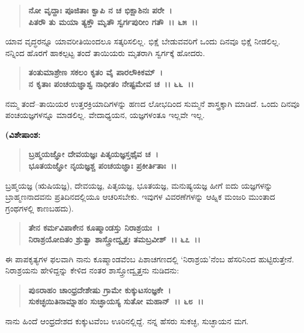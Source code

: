 \begin{verse}
\textbf{ನೋ ವೃದ್ದಾಃ ಪೂಜಿತಾಃ ಕ್ವಾಪಿ ನ ಚ ಭಿಕ್ಷಾಶಿನಃ ಪರೇ~।}\\\textbf{ಪಿತರೌ ತು ಮಯಾ ತ್ಯಕ್ತೌ ಮೃತೌ ಸ್ವರ್ಗಪುರೀಂ ಗತೌ~।। ೬೫~।।}
\end{verse}

ಯಾವ ವೃದ್ಧರನ್ನೂ ಯಾವರೀತಿಯಿಂದಲೂ ಸತ್ಕರಿಸಲಿಲ್ಲ. ಭಿಕ್ಷೆ ಬೇಡುವವರಿಗೆ ಒಂದು ದಿನವೂ ಭಿಕ್ಷೆ ನೀಡಲಿಲ್ಲ. ನನ್ನಿಂದ ಹೊರಗೆ ಹಾಕಲ್ಪಟ್ಟ ತಂದೆ ತಾಯಿಯರು ಮೃತರಾಗಿ ಸ್ವರ್ಗಕ್ಕೆ ಹೋದರು.

\begin{verse}
\textbf{ತಂತುಮಾಶ್ರೇಣ ಸಕಲಂ ಕೃತಂ ವೈ ಪಾರಲೌಕಿಕಮ್~।}\\\textbf{ನ ಕೃತಾಃ ಪಂಚಯಜ್ಞಾಶ್ವ ನಾಧೀತಂ ನೇಷ್ಟಮೇವ ಚ~।। ೬೬~।।}
\end{verse}

ನಮ್ಮ ತಂದೆ–ತಾಯಿಯರ ಉತ್ತರಕ್ರಿಯಾದಿಗಳನ್ನು ಹಣದ ಲೋಭದಿಂದ ಸುಮ್ಮನೆ ಶಾಸ್ತ್ರಕ್ಕಾಗಿ ಮಾಡಿದೆ. ಒಂದು ದಿನವೂ ಪಂಚಯಜ್ಞಗಳನ್ನೂ ಮಾಡಲಿಲ್ಲ. ವೇದಾಧ್ಯಯನ, ಯಜ್ಞಗಳಂತೂ ಇಲ್ಲವೇ ಇಲ್ಲ.

\begin{flushleft}
\textbf{(ವಿಶೇಷಾಂಶ:}
\end{flushleft}

\begin{verse}
\textbf{ಬ್ರಹ್ಮಯಜ್ಞೋ ದೇವಯಜ್ಞಃ ಪಿತೃಯಜ್ಞಸ್ತಥೈವ ಚ~।}\\\textbf{ಭೂತಯಜ್ಞೋ ನೃಯಜ್ಞಶ್ಚ ಪಂಚಯಜ್ಞಾಃ ಪ್ರಕೀರ್ತಿತಾಃ~।।}
\end{verse}

ಬ್ರಹ್ಮಯಜ್ಞ (ಋಷಿಯಜ್ಞ), ದೇವಯಜ್ಞ, ಪಿತೃಯಜ್ಞ, ಭೂತಯಜ್ಞ, ಮನುಷ್ಯಯಜ್ಞ ಹೀಗೆ ಐದು ಯಜ್ಞಗಳನ್ನು ಬ್ರಾಹ್ಮಣನಾದವನು ಪ್ರತಿದಿನದಲ್ಲಿಯೂ ಆಚರಿಸಬೇಕು. ಇವುಗಳ ವಿವರಣೆಗಳನ್ನು ಆಹ್ನಿಕ ಮಂಜರಿ ಮುಂತಾದ ಗ್ರಂಥಗಳಲ್ಲಿ ಕಾಣಬಹದು).

\begin{verse}
\textbf{ತೇನ ಕರ್ಮವಿಪಾಕೇನ ಕೂಷ್ಮಾಂಡಸ್ತು ನಿರಾಶ್ರಯಃ~।}\\\textbf{ನಿರಾಶ್ರಯೋದಿತಂ ಶ್ರುತ್ವಾ ಶಾಸ್ತ್ರೋದ್ವೃತ್ತಃ ತಮಬ್ರವೀಶ್~।। ೬೭~।।}
\end{verse}

ಈ ಪಾಪಕೃತ್ಯಗಳ ಫಲವಾಗಿ ನಾನು ಕೂಷ್ಮಾಂಡವೆಂಬ ಪಿಶಾಚಗಣದಲ್ಲಿ `ನಿರಾಶ್ರಯ'ನೆಂಬ ಹೆಸರಿನಿಂದ ಹುಟ್ಟಿರುತ್ತೇನೆ. ನಿರಾಶ್ರಯನು ಹೇಳಿದ್ದನ್ನು ಕೇಳಿದ ನಂತರ ಶಾಸ್ತ್ರೋದ್ವೃತ್ತನು ನುಡಿದನು:

\begin{verse}
\textbf{ಪುಽರಾಹಂ ಚಾಂಧ್ರದೇಶೇಷು ಗ್ರಾಮೇ ಕುಕ್ಕುಟಸಂಜ್ಞಕೇ~।}\\\textbf{ಸುಕಚ್ಛಯಿತಿನಾಮ್ನಾಹಂ ಸುಚ್ಛಾಯಸ್ಯ ಸುತೋ ಮಹಾನ್~।। ೬೮~।।}
\end{verse}

ನಾನು ಹಿಂದೆ ಆಂಧ್ರದೇಶದ ಕುಕ್ಕುಟವೆಂಬ ಊರಿನಲ್ಲಿದ್ದೆ. ನನ್ನ ಹೆಸರು ಸುಕಚ್ಛ, ಸುಚ್ಛಾಯನ ಮಗ.

